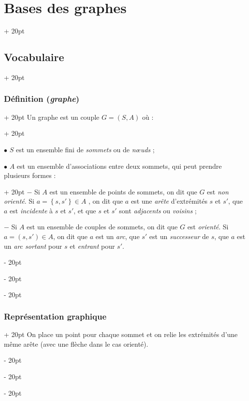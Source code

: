 \documentclass[a4paper, 12pt, twoside]{article}
\newcommand{\set}[1]{\left\{ #1 \right\}}
\newcommand{\ind}[1][20pt]{\advance\leftskip + #1}
\newcommand{\deind}[1][20pt]{\advance\leftskip - #1}
\newenvironment{indt}[2][20pt]{#2 \par \ind[#1]}{\par \deind} %
\begin{document}
    \begin{indt}{\section{Bases des graphes}}
        \begin{indt}{\subsection{Vocabulaire}}
            \begin{indt}{\subsubsection{Définition (\textit{graphe})}}
                \begin{indt}{Un graphe est un couple $G = (S, A)$ où :}
                    \label{2.1.1}

                    $\bullet$ $S$ est un ensemble fini de \textit{sommets} ou de \textit{n\oe uds} ;

                    \begin{indt}{$\bullet$ $A$ est un ensemble d'associations entre deux sommets, qui peut prendre plusieurs formes :}
                        $-$ Si $A$ est un ensemble de points de sommets, on dit que $G$ est \textit{non orienté}.
                        Si $a = \set{s, s'} \in A$ , on dit que $a$ est une \textit{arête} d'extrémités $s$ et $s'$, que $a$ est \textit{incidente} à $s$ et $s'$, et que $s$ et $s'$ sont \textit{adjacents} ou \textit{voisins} ;

                        $-$ Si $A$ est un ensemble de couples de sommets, on dit que $G$ est \textit{orienté}.
                        \newline
                        Si $a = (s, s') \in A$, on dit que $a$ est un \textit{arc}, que $s'$ est un \textit{successeur} de $s$, que $a$ est un \textit{arc sortant} pour $s$ et \textit{entrant} pour $s'$.
                    \end{indt}
                \end{indt}
            \end{indt}

            \vspace{12pt}
            
            \begin{indt}{\subsubsection{Représentation graphique}}
                On place un point pour chaque sommet et on relie les extrémités d'une même arête (avec une flèche dans le cas orienté).


\end{indt}
\end{indt}
\end{indt}
\end{document}
